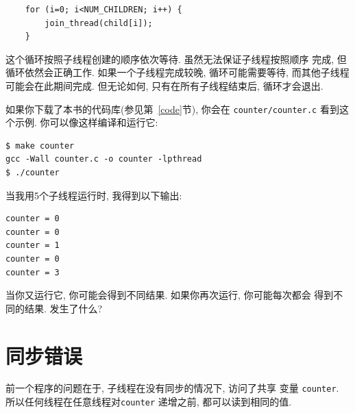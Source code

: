\documentclass[12pt]{book}
\begin{document}
{\begin{verbatim}
    for (i=0; i<NUM_CHILDREN; i++) {
        join_thread(child[i]);
    }
\end{verbatim}

这个循环按照子线程创建的顺序依次等待. 虽然无法保证子线程按照顺序
完成, 但循环依然会正确工作. 如果一个子线程完成较晚, 循环可能需要等待, 
而其他子线程可能会在此期间完成. 但无论如何, 只有在所有子线程结束后, 
循环才会退出.

如果你下载了本书的代码库(参见第~\ref{code}节), 你会在
{\tt counter/counter.c} 看到这个示例. 你可以像这样编译和运行它: 

\begin{verbatim}
$ make counter
gcc -Wall counter.c -o counter -lpthread
$ ./counter
\end{verbatim}

当我用5个子线程运行时, 我得到以下输出:

\begin{verbatim}
counter = 0
counter = 0
counter = 1
counter = 0
counter = 3
\end{verbatim}

当你又运行它, 你可能会得到不同结果. 如果你再次运行, 你可能每次都会
得到不同的结果. 发生了什么?


\section{同步错误}

前一个程序的问题在于, 子线程在没有同步的情况下, 访问了共享
变量 {\tt counter}. 所以任何线程在任意线程对{\tt counter} 递增之前, 
都可以读到相同的值.

}
\end{document}
